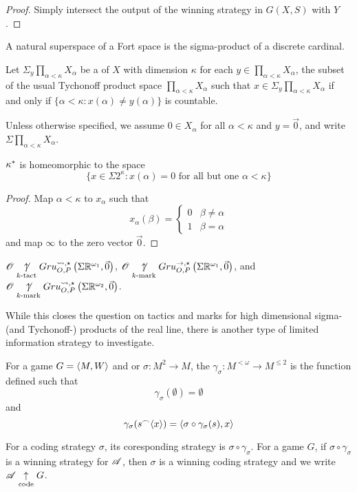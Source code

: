 \begin{proof}
  Simply intersect the output of the winning strategy in $G(X,S)$ with $Y$.
\end{proof}

A natural superspace of a Fort space is the sigma-product of a discrete
cardinal.

\begin{defn}
  Let $\Sigma_{y} \prod_{\alpha<\kappa}X_\alpha$ be a  of
  $X$ with dimension $\kappa$ for each $y\in \prod_{\alpha<\kappa}X_\alpha$,
  the subset of the usual Tychonoff product space $\prod_{\alpha<\kappa}X_\alpha$
  such that $x\in \Sigma_y \prod_{\alpha<\kappa}X_\alpha$
  if and only if $\{\alpha<\kappa : x(\alpha)\not=y(\alpha)\}$ is countable.

  Unless otherwise specified, we assume $0\in X_\alpha$ for all $\alpha<\kappa$
  and $y=\vec 0$, and write $\Sigma \prod_{\alpha<\kappa}X_\alpha$.
\end{defn}

\begin{prop}
  $\kappa^*$ is homeomorphic to the space
  \[
    \{
    x\in \Sigma 2^\kappa
      :
    x(\alpha)=0 \text{ for all but one } \alpha<\kappa
    \}
  \]
\end{prop}

\begin{proof}
  Map $\alpha<\kappa$ to $x_\alpha$ such that
  \[
    x_\alpha(\beta) =
    \left\{
      \begin{array}{ll}
        0 & \beta\not=\alpha \\
        1 & \beta=\alpha
      \end{array}
    \right.
  \]
  and map $\infty$ to the zero vector $\vec0$.
\end{proof}

\begin{cor}
  $\mathscr{O}\underset{k\text{-tact}}{\not\uparrow}Gru_{O,P}^{\leadsto,\star}\left({\Sigma\mathbb{R}^{\omega_1}},{\vec0}\right)$,
  $\mathscr{O}\underset{k\text{-mark}}{\not\uparrow}Gru_{O,P}^{\to,\star}\left({\Sigma\mathbb{R}^{\omega_1}},{\vec0}\right)$, and
  $\mathscr{O}\underset{k\text{-mark}}{\not\uparrow}Gru_{O,P}^{\leadsto,\star}\left({\Sigma\mathbb{R}^{\omega_2}},{\vec0}\right)$.
\end{cor}

While this closes the question on tactics and marks for high dimensional
sigma- (and Tychonoff-) products of the real line, there is another type of
limited information strategy to investigate.

\begin{defn}
  For a game $G=\langle M,W\rangle$ and  or 
  $\sigma:M^2\to M$, the 
  $\gamma_\sigma: M^{<\omega}\to M^{\leq2}$ is the function defined such that
    \[
      \gamma_\sigma(\emptyset) = \emptyset
    \]
  and
    \[
      \gamma_\sigma(s{^\frown}\langle x\rangle) = \langle\sigma\circ\gamma_\sigma(s),x\rangle
    \]

  For a coding strategy $\sigma$, its coresponding strategy is
  $\sigma\circ\gamma_\sigma$. For a game $G$, if $\sigma\circ\gamma_\sigma$
  is a winning strategy for $\mathscr{A}$, then $\sigma$ is a winning coding
  strategy and we write $\mathscr{A} \underset{\text{code}}{\uparrow} G$.
\end{defn}


